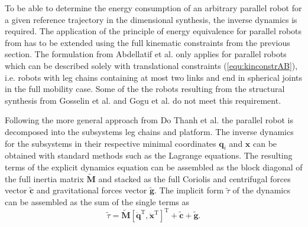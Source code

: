 \documentclass[fleqn,a4paper,10pt]{article}
\newcommand{\bm}[1]{\mathbf{#1}}
\newcommand{\transp}[0]{{\mathrm{T}}}
\begin{document}
\begin{multicols}{2}
To be able to determine the energy consumption of an arbitrary parallel robot for a given reference trajectory in the dimensional synthesis, the inverse dynamics is required.
The application of the principle of energy equivalence for parallel robots from \cite{AbdellatifHei2009,DoThanhKotHeiOrt2009b} has to be extended using the full kinematic constraints from the previous section.
The formulation from Abdellatif et al. \cite{AbdellatifHei2009} only applies for parallel robots which can be described solely with translational constraints (\ref{equ:kinconstrAB}), i.e. robots with leg chains containing at most two links and end in spherical joints in the full mobility case.
Some of the the robots resulting from the structural synthesis from Gosselin et al. \cite{KongGos2007} and Gogu et al. \cite{Gogu2008} do not meet this requirement.

Following the more general approach from Do Thanh et al. \cite{DoThanhKotHeiOrt2009b} the parallel robot is decomposed into the subsystems leg chains and platform.
The inverse dynamics for the subsystems in their respective minimal coordinates $\bm{q}_i$ and $\bm{x}$ can be obtained with standard methods such as the Lagrange equations.
The resulting terms of the explicit dynamics equation can be assembled as the block diagonal of the full inertia matrix $\tilde{\bm{M}}$ and stacked as the full Coriolis and centrifugal forces vector $\tilde{\bm{c}}$ and gravitational forces vector $\tilde{\bm{g}}$.
The implicit form $\tilde{\tau}$ of the dynamics can be assembled as the sum of the single terms as
\begin{equation}
\tilde{\tau} = \tilde{\bm{M}} [\ddot{\bm{q}}^\transp, \ddot{\bm{x}}^\transp]^\transp + \tilde{\bm{c}} + \tilde{\bm{g}}.
\label{equ:subsys_implicit_dyn}
\end{equation}



\end{multicols}
\end{document}
